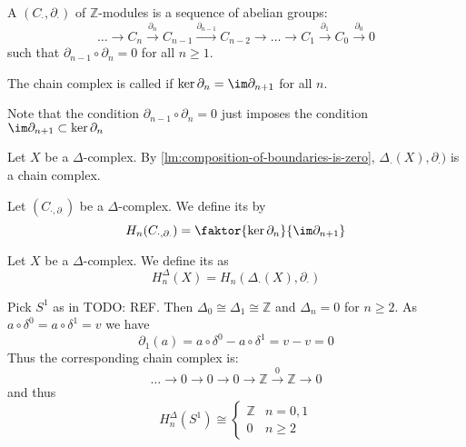 \begin{definition}\label{def:}
    A  $(C_{\cdot }, \partial_{\cdot })$ of $\mathbb{Z}$-modules is a sequence of abelian groups:
    \[
    \ldots \to C_n \stackrel{\partial_n}{\longrightarrow} C_{n-1}\stackrel{\partial_{n-1}}{\longrightarrow} C_{n-2}\to \ldots\to C_1 \stackrel{\partial_1}{\longrightarrow} C_0 \stackrel{\partial_0}{\longrightarrow} 0
    \] 
    such that $\partial_{n-1}\circ \partial_n = 0$ for all $n\geq 1$.

    The chain complex is called  if $\ker \partial_n = \im \partial_{n+1}$  for all $n$.
\end{definition}
\begin{remark}
    Note that the condition $\partial_{n-1} \circ  \partial_n = 0$ just imposes the condition $\im \partial_{n+1} \subset \ker \partial_n$
\end{remark}

\begin{example}
    Let $X$ be a  $\Delta$-complex. By \autoref{lm:composition-of-boundaries-is-zero}, $\Delta_{\cdot }(X),\partial_{\cdot })$ is a chain complex.
\end{example}

\begin{definition}\label{def:homology-group}
    Let $(C_{\cdot ,\partial_{\cdot }})$ be a $\Delta$-complex. We define its  by
    \[
        H_n(C_{\cdot ,\partial_{\cdot }}) = \faktor{\ker \partial_n}{\im \partial_{n+1}}
    \] 
\end{definition}

\begin{definition}
    Let $X$ be a  $\Delta$-complex. We define its  as 
    \[
        H_n^{\Delta} (X) = H_n(\Delta_{\cdot }(X),\partial_{\cdot })
    \] 
\end{definition}

\begin{example}
Pick $S^1$ as in TODO: REF.  Then $\Delta_0 \cong \Delta_1 \cong \mathbb{Z}$ and $\Delta_n = 0$ for $n\geq 2$. As $a \circ  δ^0 = a \circ  δ^1 = v$ we have
\[
    \partial_1(a) = a \circ  δ^0 - a \circ  δ^1 = v - v = 0
\] 
Thus the corresponding chain complex is:
\[
\ldots \to  0 \to  0 \to  0 \to  \mathbb{Z} \stackrel{0}{\longrightarrow} \mathbb{Z} \to  0
\] 
and thus
\[
    H_n^{\Delta}(S^1) \cong \begin{cases}
        \mathbb{Z} & n = 0,1 \\
        0 & n\geq 2
    \end{cases}
\] 
\end{example}
